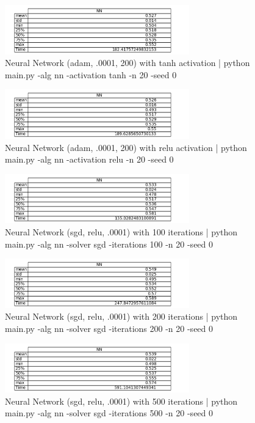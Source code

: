 \documentclass{article}
\begin{document}
\begin{figure}
\begin{center}
\includegraphics[width=8cm]{images/nn_tanh}
\caption{Neural Network (adam, .0001, 200) with tanh activation | python main.py -alg nn -activation tanh -n 20 -seed 0}
\end{center}
\end{figure}
\begin{figure}
\begin{center}
\includegraphics[width=8cm]{images/nn_relu}
\caption{Neural Network (adam, .0001, 200) with relu activation | python main.py -alg nn -activation relu -n 20 -seed 0}
\end{center}
\end{figure}
\begin{figure}
\begin{center}
\includegraphics[width=8cm]{images/nn_100}
\caption{Neural Network (sgd, relu, .0001) with 100 iterations | python main.py -alg nn -solver sgd -iterations 100 -n 20 -seed 0}
\end{center}
\end{figure}
\begin{figure}
\begin{center}
\includegraphics[width=8cm]{images/nn_200}
\caption{Neural Network (sgd, relu, .0001) with 200 iterations | python main.py -alg nn -solver sgd -iterations 200 -n 20 -seed 0}
\end{center}
\end{figure}
\begin{figure}
\begin{center}
\includegraphics[width=8cm]{images/nn_500}
\caption{Neural Network (sgd, relu, .0001) with 500 iterations | python main.py -alg nn -solver sgd -iterations 500 -n 20 -seed 0}
\end{center}
\end{figure}
\end{document}
